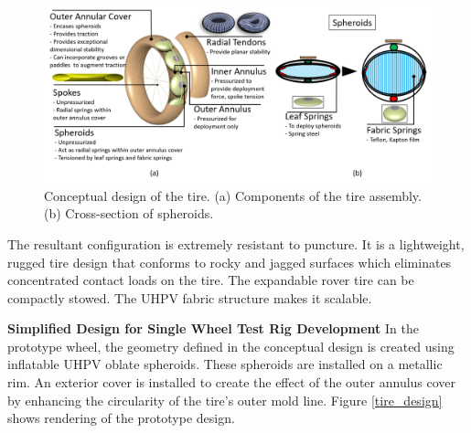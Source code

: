 \documentclass{article}
\begin{document}
\begin{figure}[hbt!]
\centering
\includegraphics[width=1\textwidth]{general-images/tire_design_original.png}
\caption{Conceptual design of the tire. (a) Components of the tire assembly. (b) Cross-section of spheroids.}
\label{fig:tire_design_original}
\end{figure}

The resultant configuration is extremely resistant to puncture. It is a lightweight, rugged tire design that conforms to rocky and jagged surfaces which eliminates concentrated contact loads on the tire. The expandable rover tire can be compactly stowed. The UHPV fabric structure makes it scalable. 

\textbf{Simplified Design for Single Wheel Test Rig Development}
\newline
In the prototype wheel, the geometry defined in the conceptual design is created using inflatable UHPV oblate spheroids. These spheroids are installed on a metallic rim. An exterior cover is installed to create the effect of the outer annulus cover by enhancing the circularity of the tire's outer mold line. Figure \ref{tire_design} shows rendering of the prototype design.   
\end{document}
